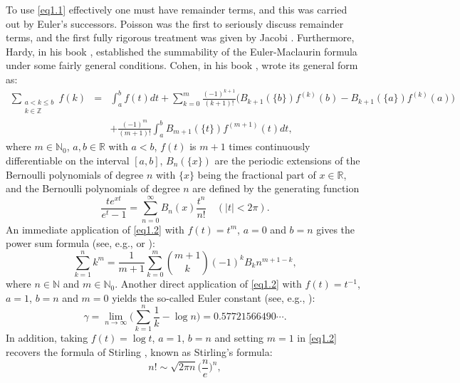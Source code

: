 \documentclass[reqno]{amsart}
\numberwithin{equation}{section}
\begin{document}
To use \eqref{eq1.1} effectively one must have remainder terms, and this was carried out by Euler's successors. Poisson \cite{poisson} was the first to seriously discuss remainder terms, and the first fully rigorous treatment was given by Jacobi \cite{jacobi}. Furthermore, Hardy, in his book \cite[Chapter 13]{hardy2}, established the summability of the Euler-Maclaurin formula under some fairly general conditions. Cohen, in his book \cite[Theorem 9.2.2]{cohen}, wrote its general form as:
\begin{eqnarray}\label{eq1.2}
\sum_{\substack{a<k\leqslant b\\k\in\mathbb{Z}}}f(k)&=&\int_{a}^{b}f(t)dt+\sum_{k=0}^{m}\frac{(-1)^{k+1}}{(k+1)!}\bigl(B_{k+1}(\{b\})f^{(k)}(b)-B_{k+1}(\{a\})f^{(k)}(a)\bigl)\nonumber\\
&&+\frac{(-1)^{m}}{(m+1)!}\int_{a}^{b}B_{m+1}(\{t\})f^{(m+1)}(t)dt,
\end{eqnarray}
where $m\in\mathbb{N}_{0}$, $a,b\in\mathbb{R}$ with $a<b$, $f(t)$ is $m+1$
times continuously differentiable on the interval $[a,b]$, $B_{n}(\{x\})$ are the periodic extensions of the Bernoulli polynomials of degree $n$ with $\{x\}$ being the fractional part of $x\in\mathbb{R}$, and the Bernoulli polynomials of degree $n$ are defined by the generating function
\begin{equation}\label{eq1.3}
\frac{te^{xt}}{e^{t}-1}=\sum_{n=0}^{\infty}B_{n}(x)\frac{t^{n}}{n!}\quad(|t|<2\pi).
\end{equation}
An immediate application of \eqref{eq1.2} with $f(t)=t^{m}$, $a=0$ and $b=n$ gives the power sum formula (see, e.g., \cite[pp. 433--434]{euler4} or \cite[p. 230]{ireland}):
\begin{equation}\label{eq1.4}
\sum_{k=1}^{n}k^{m}=\frac{1}{m+1}\sum_{k=0}^{m}\binom{m+1}{k}(-1)^{k}B_{k}n^{m+1-k},
\end{equation}
where $n\in\mathbb{N}$ and $m\in\mathbb{N}_{0}$. Another direct application of \eqref{eq1.2} with $f(t)=t^{-1}$, $a=1$, $b=n$ and $m=0$ yields
the so-called Euler constant (see, e.g., \cite{euler2,knuth}):
\begin{equation}\label{eq1.5}
\gamma=\underset{n\rightarrow \infty}{\lim}\biggl(\sum_{k=1}^{n}\frac{1}{k}-\log n\biggl)=0.57721566490\cdots.
\end{equation}
In addition, taking $f(t)=\log t$, $a=1$, $b=n$ and setting $m=1$ in \eqref{eq1.2} recovers the formula of Stirling \cite{stirling}, known as Stirling's formula:
\begin{equation}\label{eq1.6}
n!\sim \sqrt{2\pi n}\biggl(\frac{n}{e}\biggl)^{n},
\end{equation}
\end{document}
